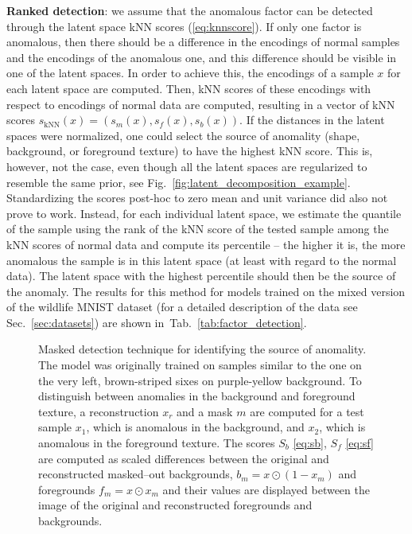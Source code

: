 \textbf{Ranked detection}: we assume that the anomalous factor can be detected through the latent space kNN scores (\ref{eq:knnscore}). If only one factor is anomalous, then there should be a difference in the encodings of normal samples and the encodings of the anomalous one, and this difference should be visible in one of the latent spaces. In order to achieve this, the encodings of a sample $x$ for each latent space are computed. Then, kNN scores of these encodings with respect to encodings of normal data are computed, resulting in a vector of kNN scores $s_{\text{kNN}}(x) = (s_m(x), s_f(x), s_b(x))$. If the distances in the latent spaces were normalized, one could select the source of anomality (shape, background, or foreground texture) to have the highest kNN score. This is, however, not the case, even though all the latent spaces are regularized to resemble the same prior, see Fig.~\ref{fig:latent_decomposition_example}. Standardizing  the scores post-hoc to zero mean and unit variance did also not prove to work. Instead, for each individual latent space, we estimate the quantile of the sample using the rank of the kNN score of the tested sample among the kNN scores of normal data and compute its percentile -- the higher it is, the more anomalous the sample is in this latent space (at least with regard to the normal data). The latent space with the highest percentile should then be the source of the anomaly. The results for this method for models trained on the mixed version of the wildlife MNIST dataset (for a detailed description of the data see Sec.~\ref{sec:datasets}) are shown in~Tab.~\ref{tab:factor_detection}. 



\begin{figure}
    \centering
    
    \caption{Masked detection technique for identifying the source of anomality. The model was originally trained on samples similar to the one on the very left, brown-striped sixes on purple-yellow background. To distinguish between anomalies in the background and foreground texture, a reconstruction $x_r$ and a mask $m$ are computed for a test sample $x_1$, which is anomalous in the background, and $x_2$, which is anomalous in the foreground texture. The scores $S_b$ \eqref{eq:sb}, $S_f$ \eqref{eq:sf} are computed as scaled differences between the original and reconstructed masked--out backgrounds, $b_m = x \odot (1-x_m)$ and foregrounds $f_m = x \odot x_m$ and their values are displayed between the image of the original and reconstructed foregrounds and backgrounds.}
    \label{fig:masked_detection}
\end{figure}

